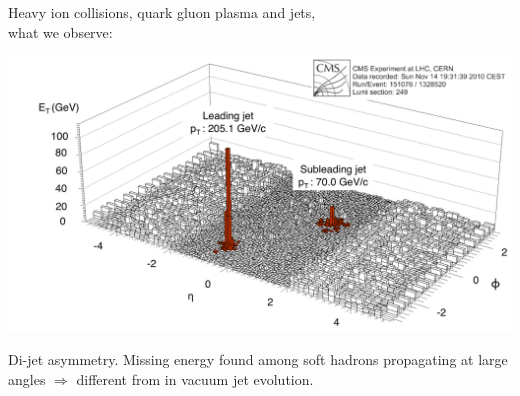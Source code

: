 \documentclass[pstricks,mathserif]{beamer}
\begin{document}
\begin{frame}

Heavy ion collisions, quark gluon plasma and jets,\\
what we observe:

\begin{center}
\includegraphics[width=1\linewidth]{CMS_JetQ.png}
\end{center}

Di-jet asymmetry. Missing energy found among soft hadrons propagating at large angles $\Rightarrow$ different from in vacuum jet evolution.


\end{frame}
\end{document}
